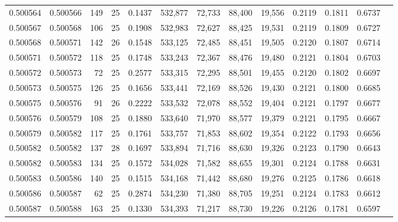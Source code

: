 \begin{tabular}{rrrrrrrrrrrrr}
0.500564 & 0.500566 & 149 &  25 &                                     0.1437 & 532,877 &  72,733 &  88,400 &  19,556 & 0.2119 & 0.1811 & 0.6737 \\
0.500567 & 0.500568 & 106 &  25 &                                     0.1908 & 532,983 &  72,627 &  88,425 &  19,531 & 0.2119 & 0.1809 & 0.6727 \\
0.500568 & 0.500571 & 142 &  26 &                                     0.1548 & 533,125 &  72,485 &  88,451 &  19,505 & 0.2120 & 0.1807 & 0.6714 \\
0.500571 & 0.500572 & 118 &  25 &                                     0.1748 & 533,243 &  72,367 &  88,476 &  19,480 & 0.2121 & 0.1804 & 0.6703 \\
0.500572 & 0.500573 &  72 &  25 &                                     0.2577 & 533,315 &  72,295 &  88,501 &  19,455 & 0.2120 & 0.1802 & 0.6697 \\
0.500573 & 0.500575 & 126 &  25 &                                     0.1656 & 533,441 &  72,169 &  88,526 &  19,430 & 0.2121 & 0.1800 & 0.6685 \\
0.500575 & 0.500576 &  91 &  26 &                                     0.2222 & 533,532 &  72,078 &  88,552 &  19,404 & 0.2121 & 0.1797 & 0.6677 \\
0.500576 & 0.500579 & 108 &  25 &                                     0.1880 & 533,640 &  71,970 &  88,577 &  19,379 & 0.2121 & 0.1795 & 0.6667 \\
0.500579 & 0.500582 & 117 &  25 &                                     0.1761 & 533,757 &  71,853 &  88,602 &  19,354 & 0.2122 & 0.1793 & 0.6656 \\
0.500582 & 0.500582 & 137 &  28 &                                     0.1697 & 533,894 &  71,716 &  88,630 &  19,326 & 0.2123 & 0.1790 & 0.6643 \\
0.500582 & 0.500583 & 134 &  25 &                                     0.1572 & 534,028 &  71,582 &  88,655 &  19,301 & 0.2124 & 0.1788 & 0.6631 \\
0.500583 & 0.500586 & 140 &  25 &                                     0.1515 & 534,168 &  71,442 &  88,680 &  19,276 & 0.2125 & 0.1786 & 0.6618 \\
0.500586 & 0.500587 &  62 &  25 &                                     0.2874 & 534,230 &  71,380 &  88,705 &  19,251 & 0.2124 & 0.1783 & 0.6612 \\
0.500587 & 0.500588 & 163 &  25 &                                     0.1330 & 534,393 &  71,217 &  88,730 &  19,226 & 0.2126 & 0.1781 & 0.6597 \\

\end{tabular}
